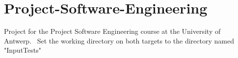 \chapter{Project-\/\+Software-\/\+Engineering}
\hypertarget{md__r_e_a_d_m_e}{}\label{md__r_e_a_d_m_e}
\label{md__r_e_a_d_m_e_autotoc_md0}%
%
 Project for the Project Software Engineering course at the University of Antwerp.~\newline
 Set the working directory on both targets to the directory named "{}\+Input\+Tests"{} 